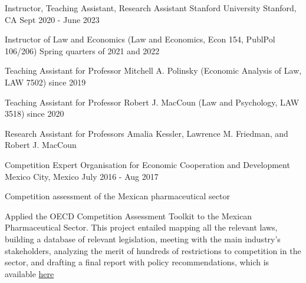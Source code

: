 

\begin{cventries}

  \cventry
    {Instructor, Teaching Assistant, Research Assistant} %
    {Stanford University} %
    {Stanford, CA} %
    {Sept 2020 - June 2023} %
    {
      \begin{cvitems} %
        \item {Instructor of Law and Economics (Law and Economics, Econ 154, PublPol 106/206) Spring quarters of 2021 and 2022}
        \item {Teaching Assistant for Professor Mitchell A. Polinsky (Economic Analysis of Law, LAW 7502) since 2019}
        \item {Teaching Assistant for Professor Robert J. MacCoun (Law and Psychology, LAW 3518) since 2020}
        \item {Research Assistant for Professors Amalia Kessler, Lawrence M. Friedman, and Robert J. MacCoun}
      \end{cvitems}
    }

  \cventry
    {Competition Expert} %
    {Organisation for Economic Cooperation and Development} %
    {Mexico City, Mexico} %
    {July 2016 - Aug 2017} %
    {
      \begin{cvitems} %
        \item {Competition assessment of the Mexican pharmaceutical sector}
        \item {Applied the OECD Competition Assessment Toolkit to the Mexican Pharmaceutical Sector. This project entailed mapping all the relevant laws, building a database of relevant legislation, meeting with the main industry's stakeholders, analyzing the merit of hundreds of restrictions to competition in the sector, and drafting a final report with policy recommendations, which is available \href{https://www.oecd.org/publications/oecd-competition-assessment-reviews-mexico-9789264288218-en.htm}{here}}
      \end{cvitems}
    }
    

\end{cventries}
